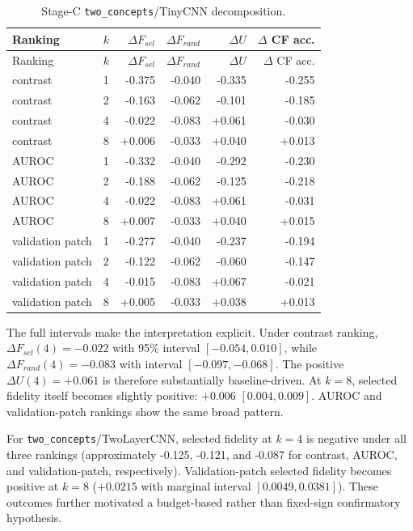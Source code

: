 {
\small
\setlength{\tabcolsep}{3pt}
\begin{longtable}{llrrrr}
\caption{Stage-C \texttt{two\_concepts}/TinyCNN decomposition.}\label{tab:stage-c-decomp}\\
\toprule
Ranking & $k$ & $\Delta F_{sel}$ & $\Delta F_{rand}$ & $\Delta U$ & $\Delta$ CF acc. \\
\midrule
\endfirsthead
\toprule
Ranking & $k$ & $\Delta F_{sel}$ & $\Delta F_{rand}$ & $\Delta U$ & $\Delta$ CF acc. \\
\midrule
\endhead
\bottomrule
\endfoot
contrast & 1 & -0.375 & -0.040 & -0.335 & -0.255 \\
contrast & 2 & -0.163 & -0.062 & -0.101 & -0.185 \\
contrast & 4 & -0.022 & -0.083 & +0.061 & -0.030 \\
contrast & 8 & +0.006 & -0.033 & +0.040 & +0.013 \\
AUROC & 1 & -0.332 & -0.040 & -0.292 & -0.230 \\
AUROC & 2 & -0.188 & -0.062 & -0.125 & -0.218 \\
AUROC & 4 & -0.022 & -0.083 & +0.061 & -0.031 \\
AUROC & 8 & +0.007 & -0.033 & +0.040 & +0.015 \\
validation patch & 1 & -0.277 & -0.040 & -0.237 & -0.194 \\
validation patch & 2 & -0.122 & -0.062 & -0.060 & -0.147 \\
validation patch & 4 & -0.015 & -0.083 & +0.067 & -0.021 \\
validation patch & 8 & +0.005 & -0.033 & +0.038 & +0.013 \\
\end{longtable}
\normalsize
}

The full intervals make the interpretation explicit. Under contrast ranking, $\Delta F_{sel}(4)=-0.022$ with 95\% interval $[-0.054,0.010]$, while $\Delta F_{rand}(4)=-0.083$ with interval $[-0.097,-0.068]$. The positive $\Delta U(4)=+0.061$ is therefore substantially baseline-driven. At $k=8$, selected fidelity itself becomes slightly positive: $+0.006$ $[0.004,0.009]$. AUROC and validation-patch rankings show the same broad pattern.

For \texttt{two\_concepts}/TwoLayerCNN, selected fidelity at $k=4$ is negative under all three rankings (approximately -0.125, -0.121, and -0.087 for contrast, AUROC, and validation-patch, respectively). Validation-patch selected fidelity becomes positive at $k=8$ ($+0.0215$ with marginal interval $[0.0049,0.0381]$). These outcomes further motivated a budget-based rather than fixed-sign confirmatory hypothesis.

